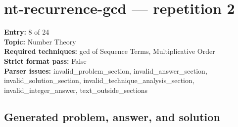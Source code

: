 \documentclass[11pt]{article}
\begin{document}
\section{nt-recurrence-gcd --- repetition 2}
{\color{metadata}
\textbf{Entry:} 8 of 24\\
\textbf{Topic:} Number Theory\\
\textbf{Required techniques:} gcd of Sequence Terms, Multiplicative Order\\
\textbf{Strict format pass:} False\\
\textbf{Parser issues:} invalid\_problem\_section, invalid\_answer\_section, invalid\_solution\_section, invalid\_technique\_analysis\_section, invalid\_integer\_answer, text\_outside\_sections
}

\subsection*{Generated problem, answer, and solution}
\end{document}
